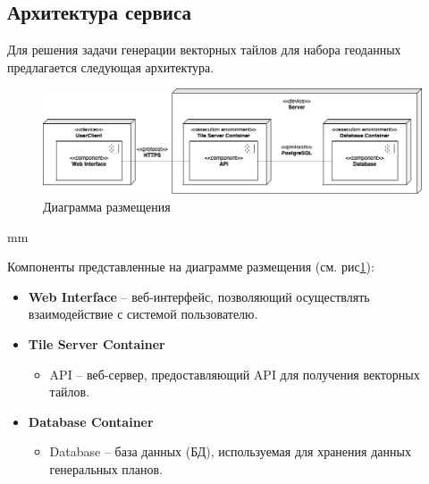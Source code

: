 \subsection*{\large{Архитектура сервиса}}

Для решения задачи генерации векторных тайлов
для набора геоданных предлагается следующая архитектура.

\begin{figure}[H]
	\hspace*{-1 cm}\includegraphics[width=\textwidth, left]{images/architecture/1}
	\caption{Диаграмма размещения}
	\label{pic:architecture__deployment-diagram}
\end{figure}
 mm

\noindent Компоненты представленные на диаграмме размещения (см. рис\ref{pic:architecture__deployment-diagram}):
\begin{itemize}
	\item \textbf{Web Interface} -- веб-интерфейс, позволяющий осуществлять взаимодействие с системой пользователю.
	\item \textbf{Tile Server Container}
	\begin{itemize}
		\item API -- веб-сервер, предоставляющий API для получения векторных тайлов.
	\end{itemize}
	\item \textbf{Database Container}
	\begin{itemize}
		\item Database -- база данных (БД), используемая для хранения данных генеральных планов.
	\end{itemize}
\end{itemize}


